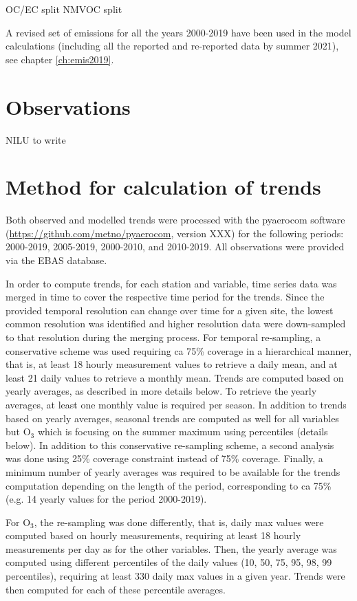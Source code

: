  OC/EC split
 NMVOC split
 
A revised set of emissions for all the years 2000-2019 have been used in the model calculations (including all the reported and re-reported data by summer 2021), see chapter \ref{ch:emis2019}.

\section{\label{OBSTrends}{Observations}} NILU to write

\section{\label{Method}{Method for calculation of trends}}
Both observed and modelled trends were processed with the pyaerocom software (\url{https://github.com/metno/pyaerocom}, version XXX) for the following periods: 2000-2019, 2005-2019, 2000-2010, and 2010-2019. All observations were provided via the EBAS database. 

In order to compute trends, for each station and variable, time series data was merged in time to cover the respective time period for the trends.
Since the provided temporal resolution can change over time for a given site, the lowest common resolution was identified and higher resolution data were down-sampled to that resolution during the merging process. For temporal re-sampling, a conservative scheme was used requiring ca 75\% coverage in a hierarchical manner, that is, at least 18 hourly measurement values to retrieve a daily mean, and at least 21 daily values to retrieve a monthly mean. Trends are computed based on yearly averages, as described in more details below. To retrieve the yearly averages, at least one monthly value is required per season. In addition to trends based on yearly averages, seasonal trends are computed as well for all variables but O$_{3}$ which is focusing on the summer maximum using percentiles (details below). In addition to this conservative re-sampling scheme, a second analysis was done using 25\% coverage constraint instead of 75\% coverage. Finally, a minimum number of yearly averages was required to be available for the trends computation depending on the length of the period, corresponding to ca 75\% (e.g. 14 yearly values for the period 2000-2019).

For O$_3$, the re-sampling was done differently, that is, daily max values were computed based on hourly measurements, requiring at least 18 hourly measurements per day as for the other variables. Then, the yearly average was computed using different percentiles of the daily values (10, 50, 75, 95, 98, 99 percentiles), requiring at least 330 daily max values in a given year. Trends were then computed for each of these percentile averages.

